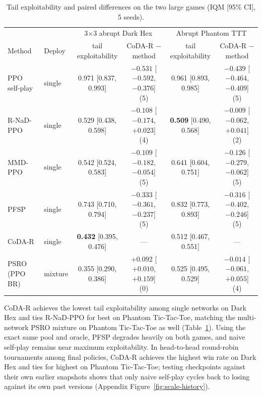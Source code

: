 \documentclass{article}
\theoremstyle{plain}
\theoremstyle{remark}
\newcommand{\codar}{CoDA-R}
\newcommand{\rnad}{R-NaD-PPO}
\begin{document}
\begin{table}[t]
\caption{Tail exploitability and paired differences on the two large games (IQM [95\% CI], 5 seeds).}
\label{tab:scale}
\begin{center}
\scriptsize
\setlength{\tabcolsep}{3pt}
\begin{tabular}{llcccc}
\toprule
 & & \multicolumn{2}{c}{3$\times$3 abrupt Dark Hex} & \multicolumn{2}{c}{Abrupt Phantom TTT} \\
Method & Deploy & tail exploitability & \codar{} $-$ method & tail exploitability & \codar{} $-$ method \\
\midrule
PPO self-play & single & 0.971 [0.837, 0.993] & $-0.531$ [$-0.592$, $-0.376$] (5) & 0.961 [0.893, 0.985] & $-0.439$ [$-0.464$, $-0.409$] (5) \\
\rnad{} & single & 0.529 [0.438, 0.598] & $-0.108$ [$-0.174$, $+0.023$] (4) & \textbf{0.509} [0.490, 0.568] & $-0.009$ [$-0.062$, $+0.041$] (2) \\
MMD-PPO & single & 0.542 [0.524, 0.583] & $-0.109$ [$-0.182$, $-0.054$] (5) & 0.641 [0.604, 0.751] & $-0.126$ [$-0.279$, $-0.062$] (5) \\
PFSP & single & 0.743 [0.710, 0.794] & $-0.333$ [$-0.361$, $-0.237$] (5) & 0.832 [0.773, 0.893] & $-0.316$ [$-0.402$, $-0.246$] (5) \\
\codar{} & single & \textbf{0.432} [0.395, 0.476] & --- & 0.512 [0.467, 0.551] & --- \\
\midrule
PSRO (PPO BR) & mixture & 0.355 [0.290, 0.386] & $+0.092$ [$+0.010$, $+0.159$] (0) & 0.525 [0.495, 0.529] & $-0.014$ [$-0.061$, $+0.055$] (4) \\
\bottomrule
\end{tabular}
\end{center}
\end{table}

\codar{} achieves the lowest tail exploitability among single networks on Dark Hex and ties \rnad{} for best on Phantom Tic-Tac-Toe, matching the multi-network PSRO mixture on Phantom Tic-Tac-Toe as well (Table~\ref{tab:scale}). Using the exact same pool and oracle, PFSP degrades heavily on both games, and naive self-play remains near maximum exploitability. In head-to-head round-robin tournaments among final policies, \codar{} achieves the highest win rate on Dark Hex and ties for highest on Phantom Tic-Tac-Toe; testing checkpoints against their own earlier snapshots shows that only naive self-play cycles back to losing against its own past versions (Appendix Figure~\ref{fig:scale-history}).
\end{document}

